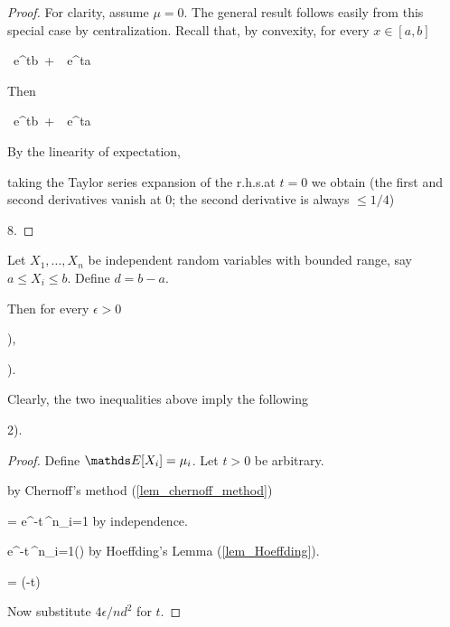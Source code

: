 \documentclass[scombinatorics.tex]{subfiles}
\begin{document}
\begin{proof}
  For clarity, assume $\mu=0$.
  The general result follows easily from this special case by centralization.
  Recall that, by convexity, for every $x\in[a,b]$

  {\le}
  {\ e^{tb}\ +\ \ e^{ta}}

  Then

  {\le}
  {\ e^{tb}\ +\ \ e^{ta}}

  By the linearity of expectation,

  \ceq{\hfill\Ex\Big[e^{tX}\Big]}
  {\le}
  {}

  \ceq{\hfill\log\Ex\Big[e^{tX}\Big]}
  {\le}
  {\log{}}

taking the Taylor series expansion of the r.h.s.\@ at $t=0$ we obtain (the first and second derivatives vanish at $0$; the second derivative is always $\le 1/4$)

\ceq{\hfill\log\Ex\Big[e^{tX}\Big]}
    {\le}
    {8.}
\end{proof}

\begin{void_thm}\label{Hoeffding_inequality}
  Let $X_1,\dots,X_n$ be independent random variables with bounded range, say $a\le X_i\le b$. Define $d=b-a$.
  
  
  Then for every $\epsilon>0$ 

      {\le}
      {\Big),}

      {\le}
      {\Big).}\smallskip
\end{void_thm}

Clearly, the two inequalities above imply the following

    {\le}
    {2\Big).}\smallskip


\begin{proof}
  Define $\Ex[X_i]=\mu_i$.
  Let $t>0$ be arbitrary.

  \hfill by Chernoff's method (\ref{lem_chernoff_method})

  \ceq{}
      {=}
      {e^{-t\epsilon}\,\prod^n_{i=1}\Ex\Big[e^{t\,(X_i-\mu_i)}\Big]}
      \hfill by independence.


      \ceq{}
      {\le}
      {e^{-t\epsilon}\,\prod^n_{i=1}\exp\Big(\Big)}
      \hfill by Hoeffding's Lemma (\ref{lem_Hoeffding}).

  \ceq{}
      {=}
      {\exp\Big(-t\epsilon\Big)}

  Now substitute $4\epsilon/nd^2$ for $t$.
\end{proof}
\end{document}
